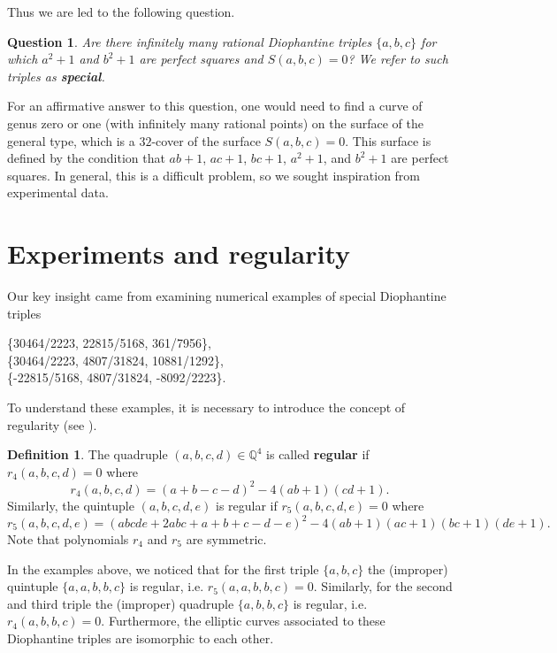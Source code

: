 \documentclass[a4paper]{amsart}
\theoremstyle{plain}
\newtheorem{question}{Question}
\def\Q{\mathbb{Q}}
\theoremstyle{definition}
\newtheorem{definition}{Definition}
\begin{document}
Thus we are led to the following question.
\begin{question}
	Are there infinitely many rational Diophantine triples $\{a,b,c\}$ for which $a^2+1$ and $b^2+1$ are perfect squares and $S(a,b,c)=0$?
	We refer to such triples as {\bf special}.
\end{question}




For an affirmative answer to this question, one would need to find a curve of genus zero or one (with infinitely many rational points) on the surface of the general type, which is a $32$-cover of the surface $S(a,b,c)=0$. This surface is defined by the condition that $ab+1$, $ac+1$, $bc+1$, $a^2+1$, and $b^2+1$ are perfect squares. In general, this is a difficult problem, so we sought inspiration from experimental data.

\section{Experiments and regularity} \label{sec:experiments}

Our key insight came from examining numerical examples of special Diophantine triples

\begin{center}
	\{30464/2223, 22815/5168, 361/7956\},\\
	\{30464/2223, 4807/31824, 10881/1292\},\\
	\{-22815/5168, 4807/31824, -8092/2223\}.
\end{center}	

To understand these examples, it is necessary to introduce the concept of regularity (see \cite{DKP-reg,DP2}).

\begin{definition}
	The quadruple $(a,b,c,d)\in \Q^4$ is called {\bf regular} if $r_4(a,b,c,d)=0$ where
	$$r_4(a,b,c,d)=(a+b-c-d)^2-4(ab+1)(cd+1).$$ Similarly, the quintuple $(a,b,c,d,e)$ is regular if $r_5(a,b,c,d,e)=0$
	where $$r_5(a,b,c,d,e)=(abcde+2abc+a+b+c-d-e)^2-4(ab+1)(ac+1)(bc+1)(de+1).$$ 
	Note that polynomials $r_4$ and $r_5$ are symmetric.
\end{definition}




In the examples above, we noticed that for the first triple $\{a,b,c\}$ the (improper) quintuple $\{a,a,b,b,c\}$ is regular, i.e. $r_5(a,a,b,b,c)=0$.
Similarly, for the second and third triple the (improper) quadruple $\{a,b,b,c\}$ is regular, i.e. $r_4(a,b,b,c)=0$. Furthermore, the elliptic curves associated to these Diophantine triples are isomorphic to each other.
\end{document}
